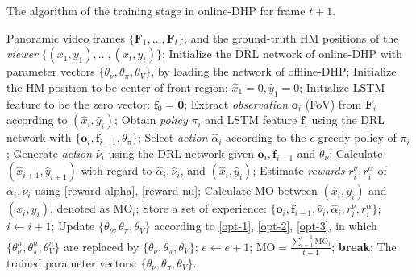 \documentclass[10pt,journal,compsoc]{IEEEtran}
\begin{document}
\begin{algorithm}
   \caption{The algorithm of the training stage in online-DHP for frame $t+1$.}
   \label{online-DHP-algorithm-training}
   \footnotesize
\begin{algorithmic}
    Panoramic video frames $\{\mathbf{F}_1, \ldots, \mathbf{F}_t \}$, and the ground-truth HM positions of the \textit{viewer} $\{(x_{1},y_{1}),\ldots, (x_{t},y_{t})\}$;
   \STATE Initialize the DRL network of online-DHP with parameter vectors $\{ \theta_{{\nu}}, \theta_{{\pi}}, \theta_{V} \}$, by loading the network of offline-DHP;
       \STATE Initialize the HM position to be center of front region: $\hat{x}_1=0,\hat{y}_1=0$;
       \STATE Initialize LSTM feature to be the zero vector: $\mathbf{f}_0=\mathbf{0}$;
           \STATE Extract \textit{observation} $\mathbf{o}_i$ (FoV) from $\mathbf{F}_i$ according to $(\hat{x}_{i},\hat{y}_{i})$;
           \STATE Obtain \textit{policy} $\pi_{i}$ and LSTM feature $\mathbf{f}_{i}$ using the DRL network with $\{\mathbf{o}_i, \mathbf{f}_{i-1}, \theta_{\pi}\}$;
           \STATE Select \textit{action} $\hat{\alpha}_{i}$ according to the $\epsilon$-greedy policy of $\pi_{i}$;
           \STATE Generate \textit{action} $\hat{\nu}_{i}$ using the DRL network given $\mathbf{o}_{i}, \mathbf{f}_{i-1}$ and $ \theta_{\nu}$;
           \STATE Calculate $(\hat{x}_{i+1}, \hat{y}_{i+1})$ with regard to $\hat{\alpha}_{i},\hat{\nu}_{i}$, and $(\hat{x}_{i}, \hat{y}_{i})$;
           \STATE Estimate \textit{rewards} $r^{\nu}_{i},\! r^{\alpha}_{i}$ of $\hat{\alpha}_{i},\hat{\nu}_{i}$ using \eqref{reward-alpha}, \eqref{reward-nu};
           \STATE Calculate MO between $(\hat{x}_{i},\hat{y}_{i})$ and $(x_{i},y_{i})$, denoted as $\text{MO}_i$;
           \STATE Store a set of experience: $\{ \mathbf{o}_{i}, \! \mathbf{f}_{i-1},\! \hat{\nu}_{i},\! \hat{\alpha}_{i},\! r^{\nu}_{i},\! r^{\alpha}_{i} \}$;
           \STATE $i \leftarrow i+1$;
       \ENDFOR
       \STATE Update $\{ \theta_{\nu}, \theta_{\pi}, \theta_{V} \}$ according to \eqref{opt-1}, \eqref{opt-2}, \eqref{opt-3}, in which $\{ \theta^{n}_{\nu}, \theta^{n}_{\pi}, \theta^{n}_{V} \}$ are replaced by $\{ \theta_{\nu}, \theta_{\pi}, \theta_{V} \}$;
       \STATE $e \leftarrow e+1$;
       \STATE $\text{MO} =  \frac{\sum_{i=1}^{t-1} \text{MO}_{i}}{t-1}$;
           \STATE \textbf{break};
       \ENDIF
  \ENDFOR
   The trained parameter vectors: $\{ \theta_{\nu}, \theta_{\pi}, \theta_{V} \}$.
\end{algorithmic}
\end{algorithm}
\end{document}

